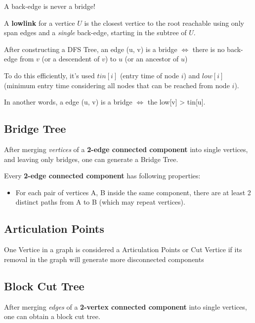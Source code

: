 		A back-edge is never a bridge!
		
		A \textbf{lowlink} for a vertice $U$ is the closest vertice to the root reachable using only span edges and a \textit{single} back-edge, starting in the subtree of $U$.
		
		After constructing a DFS Tree, an edge (u, v) is a bridge $\iff$ there is no back-edge from $v$ (or a descendent of $v$) to $u$ (or an ancestor of $u$)
		
		To do this efficiently, it's used $tin[i]$ (entry time of node $i$) and $low[i]$ (minimum entry time considering all nodes that can be reached from node $i$).
		
		In another words, a edge (u, v) is a bridge $\iff$ the low[v] > tin[u].


	\subsection{Bridge Tree}

	After merging \textit{vertices} of a \textbf{2-edge connected component} into single vertices, and leaving only bridges, one can generate a Bridge Tree.

	Every \textbf{2-edge connected component} has following properties:

    \begin{itemize}
		\item For each pair of vertices {A, B} inside the same component, there are at least 2 distinct paths from A to B (which may repeat vertices).
	\end{itemize}

	
	\subsection{Articulation Points} 

	One Vertice in a graph is considered a Articulation Points or Cut Vertice if its removal in the graph will generate more disconnected components


	\subsection{Block Cut Tree}

	After merging \textit{edges} of a \textbf{2-vertex connected component} into single vertices, one can obtain a block cut tree.

